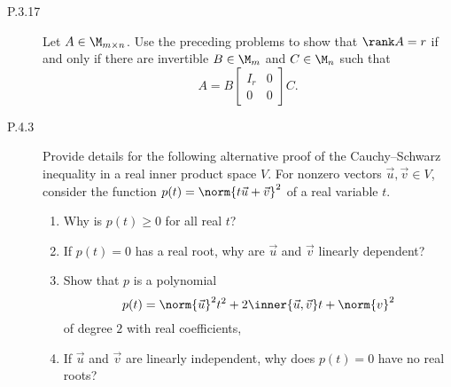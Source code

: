 \documentclass{homework}
\date{Tuesday 2/5}
\author{}
\begin{document}
\begin{description}
\item[P.3.17] Let \(A \in \M_{m\times n}\).  Use the preceding
  problems to show that \(\rank A = r\) if and only if there are
  invertible \(B \in \M_m\) and \(C \in \M_n\) such that
  \[
    A = B
    \begin{bmatrix}
      I_r & 0 \\
      0   & 0
    \end{bmatrix}
    C.
  \]

  \begin{solution}

  \end{solution}

\item[P.4.3] Provide details for the following alternative proof of
  the Cauchy--Schwarz inequality in a real inner product space \(V\).
  For nonzero vectors \(\vec u, \vec v \in V\), consider the function
  \(p(t) = \norm{t \vec u + \vec v}^2\) of a real variable \(t\).
  \begin{enumerate}
  \item Why is \(p(t) \ge 0\) for all real \(t\)?

    \begin{solution}

    \end{solution}

  \item If \(p(t) = 0\) has a real root, why are \(\vec u\) and
    \(\vec v\) linearly dependent?  \label{part:root-dependent}

    \begin{solution}

    \end{solution}

  \item Show that \(p\) is a polynomial
    \[
      p(t) =
      \norm{\vec u}^2 t^2        +
      2 \inner{\vec u, \vec v} t +
      \norm{v}^2
    \]
    of degree \(2\) with real coefficients,

    \begin{solution}

    \end{solution}

  \item If \(\vec u\) and \(\vec v\) are linearly independent, why
    does \(p(t) = 0\) have no real roots?

    \begin{solution}


\end{solution}
\end{enumerate}
\end{description}
\end{document}
